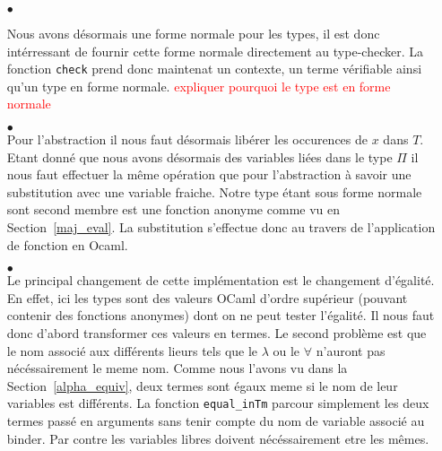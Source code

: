 \documentclass {article}
\newcommand{\codefrom}[3]
           {}
\theoremstyle{definition}
\theoremstyle{remark}
\newcommand{\todo}[1]{\textcolor{red}{#1}}
\newcommand{\fun}[1]{\lstinline!#1!}
\begin{document}
\begin{itemize}
\item[$\bullet$]

Nous avons désormais une forme normale pour les types, il est donc intérressant de 
fournir cette forme normale directement au type-checker. La fonction \fun{check} prend donc maintenat
un contexte, un terme vérifiable ainsi qu'un type en forme normale. \todo{expliquer pourquoi le type est en forme normale}

  \codefrom{dependent}{lambda}{check_head}

\item[$\bullet$] \\

  Pour l'abstraction il nous faut désormais libérer les occurences de $x$ dans $T$.
  Etant donné que nous avons désormais des variables liées dans le type $\Pi$ il nous faut
  effectuer la même opération que pour l'abstraction à savoir une substitution avec une variable
  fraiche. Notre type étant sous forme normale sont second membre est une fonction
  anonyme comme vu en Section~\ref{maj_eval}. La substitution s'effectue donc au travers de l'application de fonction en Ocaml.

  \codefrom{dependent}{lambda}{check_abs}
  
\item[$\bullet$] \\
  
  Le principal changement de cette implémentation est le changement d'égalité. 
  En effet, ici les types sont des valeurs OCaml d'ordre supérieur (pouvant contenir des fonctions anonymes) dont on ne peut 
  tester l'égalité. Il nous faut donc d'abord transformer 
  ces valeurs en termes. Le second problème est que le nom associé 
  aux différents lieurs tels que le $\lambda$ ou le $\forall$ n'auront pas nécéssairement le 
  meme nom. Comme nous l'avons vu dans la Section~\ref{alpha_equiv},
  deux termes sont égaux meme si le nom de leur variables est différents. 
  La fonction \fun{equal_inTm} parcour simplement les deux termes passé en arguments sans tenir compte
  du nom de variable associé au binder. Par contre les variables libres doivent nécéssairement etre les mêmes.

  \codefrom{dependent}{lambda}{check_inv}


\end{itemize}
\end{document}
